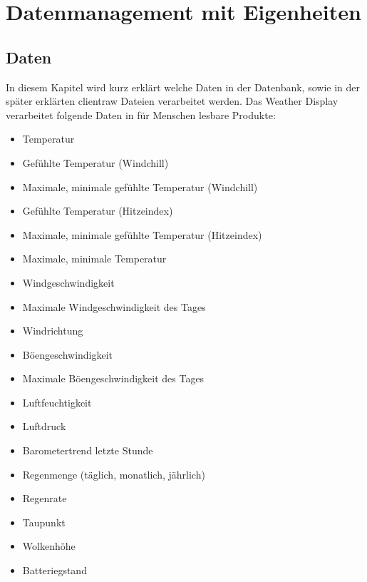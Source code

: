 \section{Datenmanagement mit Eigenheiten}

\subsection{Daten}
In diesem Kapitel wird kurz erklärt welche Daten in der Datenbank, sowie in der später erklärten clientraw Dateien verarbeitet werden. Das Weather Display verarbeitet folgende Daten in für Menschen lesbare Produkte:
\begin{itemize}
\item Temperatur
\item Gefühlte Temperatur (Windchill)
\item Maximale, minimale gefühlte Temperatur (Windchill)
\item Gefühlte Temperatur (Hitzeindex)
\item Maximale, minimale gefühlte Temperatur (Hitzeindex)
\item Maximale, minimale Temperatur 
\item Windgeschwindigkeit
\item Maximale Windgeschwindigkeit des Tages 
\item Windrichtung
\item Böengeschwindigkeit
\item Maximale Böengeschwindigkeit des Tages
\item Luftfeuchtigkeit
\item Luftdruck
\item Barometertrend letzte Stunde
\item Regenmenge (täglich, monatlich, jährlich)
\item Regenrate
\item Taupunkt
\item Wolkenhöhe
\item Batteriegstand
\end{itemize}

